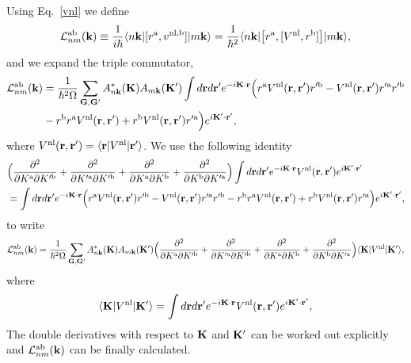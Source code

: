 \documentclass[floatfix,prb,aps,superscriptaddress,11pt,preprint,letterpaper]{revtex4}
\def\chon{black}
\begin{document}
\label{calt}
Using Eq.~\eqref{vnl} we define
\begin{align}\label{3.1}
{\cal L}^{\mathrm{a}\mathrm{b}}_{nm}(\mathbf{k}) 
\equiv\frac{1}{i\hbar}
\langle n\mathbf{k} |
[ r^{\mathrm{a}}, v^{\mathrm{nl},\mathrm{b}}]
| m\mathbf{k} \rangle
=
\frac{1}{\hbar^2}
\langle n\mathbf{k} |
\big[ r^{\mathrm{a}},[ V^{\mathrm{nl}}, r^{\mathrm{b}}]\big]
| m\mathbf{k} \rangle
,
\end{align} 
{\color{\chon} and we expand the triple commutator,}
\begin{align}\label{3.5}
{\cal L}^{\mathrm{a}\mathrm{b}}_{nm}(\mathbf{k}) 
&=
\frac{1}{\hbar^2\Omega}
\sum_{\mathbf{G},\mathbf{G}'} 
A^*_{n\mathbf{k}}(\mathbf{K}) 
A_{m\mathbf{k}}(\mathbf{K}')
\int
d\mathbf{r} d\mathbf{r}'
 e^{-i\mathbf{K}\cdot\mathbf{r}}
\Big(
r^{\mathrm{a}}
V^{\mathrm{nl}}(\mathbf{r},\mathbf{r}')
r'^{\mathrm{b}}
-
V^{\mathrm{nl}}(\mathbf{r},\mathbf{r}')
r'^{\mathrm{a}}
r'^{\mathrm{b}}
\nonumber\\
&-
r^{\mathrm{b}}
r^{\mathrm{a}}
V^{\mathrm{nl}}(\mathbf{r},\mathbf{r}')
+
 r^{\mathrm{b}}
V^{\mathrm{nl}}(\mathbf{r},\mathbf{r}')
r'^{\mathrm{a}}
\Big) 
 e^{i\mathbf{K}'\cdot\mathbf{r}'}
,
\end{align} 
where 
$V^{\mathrm{nl}}(\mathbf{r},\mathbf{r}') = \langle \mathbf{r} | V^{\mathrm{nl}}| \mathbf{r}' \rangle$.
We use the following identity
\begin{align}\label{3.4}
&
\Big(
\frac{\partial^2}{\partial K^{\mathrm{a}}\partial K'^{\mathrm{b}}}
+
\frac{\partial^2}{\partial K'^{\mathrm{a}}\partial K'^{\mathrm{b}}}
+
\frac{\partial^2}{\partial K^{\mathrm{a}}\partial K^{\mathrm{b}}}
+
\frac{\partial^2}{\partial K^{\mathrm{b}}\partial K'^{\mathrm{a}}}
\Big)
\int 
d\mathbf{r} d\mathbf{r}' 
 e^{-i\mathbf{K}\cdot\mathbf{r}}
V^{\mathrm{nl}}(\mathbf{r},\mathbf{r}') 
e^{i\mathbf{K}'\cdot\mathbf{r}'}
\nonumber\\
&=
\int d\mathbf{r} d\mathbf{r}'
 e^{-i\mathbf{K}\cdot\mathbf{r}}
\Big( 
r^{\mathrm{a}} 
V^{\mathrm{nl}}(\mathbf{r},\mathbf{r}') 
r'^{\mathrm{b}}
- 
V^{\mathrm{nl}}(\mathbf{r},\mathbf{r}') 
r'^{\mathrm{a}} 
r'^{\mathrm{b}}
- 
r^{\mathrm{b}} 
r^{\mathrm{a}} 
V^{\mathrm{nl}}(\mathbf{r},\mathbf{r}')
+
 r^{\mathrm{b}} 
V^{\mathrm{nl}}(\mathbf{r},\mathbf{r}') 
r'^{\mathrm{a}}
\Big)  
e^{i\mathbf{K}'\cdot\mathbf{r}'}
,
\end{align}
to write
\begin{align}\label{3.7}
{\cal L}^{\mathrm{a}\mathrm{b}}_{nm}(\mathbf{k})
&=
\frac{1}{\hbar^2\Omega}
\sum_{\mathbf{G},\mathbf{G}'} 
A^*_{n\mathbf{k}}(\mathbf{K}) 
A_{m\mathbf{k}}(\mathbf{K}')
\Big(
\frac{\partial^2}{\partial K^{\mathrm{a}}\partial K'^{\mathrm{b}}}
+
\frac{\partial^2}{\partial K'^{\mathrm{a}}\partial K'^{\mathrm{b}}}
+
\frac{\partial^2}{\partial K^{\mathrm{a}}\partial K^{\mathrm{b}}}
+
\frac{\partial^2}{\partial K^{\mathrm{b}}\partial K'^{\mathrm{a}}}
\Big)
\langle \mathbf{K} | 
V^{\mathrm{nl}} 
| \mathbf{K}' \rangle, 
\nonumber\\
\end{align} 
where
\begin{align}\label{vkk}
\langle \mathbf{K} | 
V^{\mathrm{nl}} 
| \mathbf{K}' \rangle 
=
\int 
d\mathbf{r} d\mathbf{r}' 
 e^{-i\mathbf{K}\cdot\mathbf{r}}
V^{\mathrm{nl}}(\mathbf{r},\mathbf{r}') 
e^{i\mathbf{K}'\cdot\mathbf{r}'}
,
\end{align}
The double derivatives with respect to $\mathbf{K}$ and $\mathbf{K}'$ 
can be worked out explicitly {\color{\chon} and} 
${\cal L}^{\mathrm{a}\mathrm{b}}_{nm}(\mathbf{k})$
{\color{\chon} can} be finally calculated.\cite{valerie}
\end{document}
